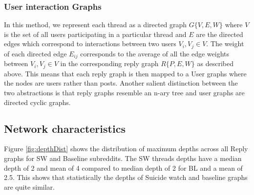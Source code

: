 \subsubsection{User interaction Graphs}
\label{Sec:Interaction_graphs}
In this method, we represent each thread as a directed graph $G\{V,E,W\}$ where $V$ is the set of all users participating in a particular thread and $E$ are the directed  edges which correspond to interactions between two users $V_i , V_j  \in V$. The weight of each directed edge $E_{ij}$ corresponds to the average of all the edge weights between $V_i , V_j  \in V$ in the corresponding reply graph $R\{P,E,W\}$ as described above. This means that each reply graph is then mapped to a User graphs where the nodes are users rather than posts. Another salient distinction between the two abstractions is that reply graphs resemble an n-ary tree and user graphs are directed cyclic graphs. 


\subsection{Network characteristics}
Figure \ref{fig:depthDist} shows the distribution of maximum depths across all Reply graphs for SW and Baseline subreddits. The SW threads depths have a median depth of 2 and mean of 4 compared to median depth of 2 for BL and a mean of 2.5. This shows that statistically the depths of Suicide watch and baseline graphs are quite similar.


